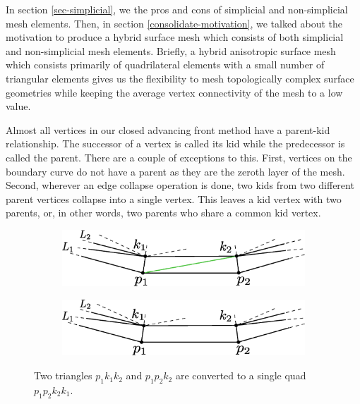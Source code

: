 In section \ref{sec-simplicial}, we the pros and cons of simplicial and non-simplicial mesh elements. Then, in section \ref{consolidate-motivation}, we talked about the motivation to produce a hybrid surface mesh which consists of both simplicial and non-simplicial mesh elements. Briefly, a hybrid anisotropic surface mesh which consists primarily of quadrilateral elements with a small number of triangular elements gives us the flexibility to mesh topologically complex surface geometries while keeping the average vertex connectivity of the mesh to a low value.

Almost all vertices in our closed advancing front method have a parent-kid relationship. The successor of a vertex is called its kid while the predecessor is called the parent. There are a couple of exceptions to this. First, vertices on the boundary curve do not have a parent as they are the zeroth layer of the mesh. Second, wherever an edge collapse operation is done, two kids from two different parent vertices collapse into a single vertex. This leaves a kid vertex with two parents, or, in other words, two parents who share a common kid vertex.

\vspace{10pt}
\begin{figure}[hbt!]
	\centering
	\begin{subfigure}{\textwidth}
		\centering
		\includegraphics[width=.7\linewidth]{img/m2/combineTriToQuad.eps}
		\caption{}
		\label{triToQuad1}
	\end{subfigure}
	\begin{subfigure}{\textwidth}
		\centering
		\includegraphics[width=.7\linewidth]{img/m2/combineTriToQuad2.eps}
		\caption{}
		\label{triToQuad2}
	\end{subfigure}
	\caption[Combining tris to quads]{Two triangles $\mathit{p_1k_1k_2}$ and $p_1p_2k_2$ are converted to a single quad $\mathit{p_1p_2k_2k_1}$.}
	\label{triToQuad}
\end{figure}

